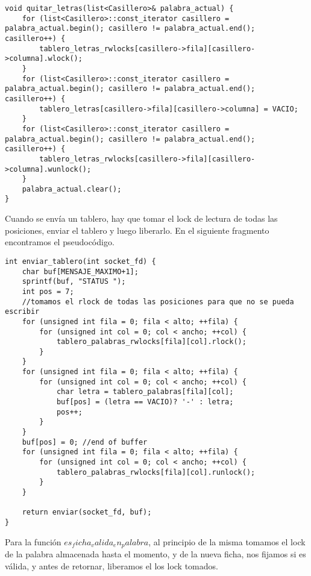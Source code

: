 \begin{lstlisting}
void quitar_letras(list<Casillero>& palabra_actual) {
    for (list<Casillero>::const_iterator casillero = palabra_actual.begin(); casillero != palabra_actual.end(); casillero++) {
        tablero_letras_rwlocks[casillero->fila][casillero->columna].wlock();
    }
    for (list<Casillero>::const_iterator casillero = palabra_actual.begin(); casillero != palabra_actual.end(); casillero++) {
        tablero_letras[casillero->fila][casillero->columna] = VACIO;
    }
    for (list<Casillero>::const_iterator casillero = palabra_actual.begin(); casillero != palabra_actual.end(); casillero++) {
        tablero_letras_rwlocks[casillero->fila][casillero->columna].wunlock();
    }
    palabra_actual.clear();
}
\end{lstlisting}

Cuando se envía un tablero, hay que tomar el lock de lectura de todas las posiciones, enviar el tablero y luego liberarlo. En el siguiente fragmento encontramos el pseudocódigo.

\begin{lstlisting}
int enviar_tablero(int socket_fd) {
    char buf[MENSAJE_MAXIMO+1];
    sprintf(buf, "STATUS ");
    int pos = 7;
    //tomamos el rlock de todas las posiciones para que no se pueda escribir
    for (unsigned int fila = 0; fila < alto; ++fila) {
        for (unsigned int col = 0; col < ancho; ++col) {
            tablero_palabras_rwlocks[fila][col].rlock();
        }
    }
    for (unsigned int fila = 0; fila < alto; ++fila) {
        for (unsigned int col = 0; col < ancho; ++col) {
            char letra = tablero_palabras[fila][col];
            buf[pos] = (letra == VACIO)? '-' : letra;
            pos++;
        }
    }
    buf[pos] = 0; //end of buffer
    for (unsigned int fila = 0; fila < alto; ++fila) {
        for (unsigned int col = 0; col < ancho; ++col) {
            tablero_palabras_rwlocks[fila][col].runlock();
        }
    }

    return enviar(socket_fd, buf);
}
\end{lstlisting}

Para la función $ es_ficha_valida_en_palabra $, al principio de la misma tomamos el lock de la palabra almacenada hasta el momento, y de la nueva ficha, nos fijamos si es válida, y antes de retornar, liberamos el los lock tomados.
